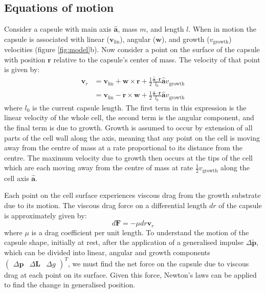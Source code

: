 \documentclass{report}
\let\oldhat\hat
\renewcommand{\vec}[1]{\mathbf{#1}}
\renewcommand{\hat}[1]{\oldhat{\mathbf{#1}}}
\newcommand{\deltap}{\Delta \vec{p}}
\newcommand{\deltaL}{\Delta \vec{L}}
\newcommand{\deltag}{\Delta g}
\begin{document}
\begin{appendices}
\chapter{Equations of motion}
\label{app:eqmot}
Consider a capsule with main axis $\hat{\vec{a}}$, mass $m$, and length $l$.  
When in motion the capsule is associated with linear ($\vec{v}_\textrm{lin}$),
angular ($\vec{w}$), and growth ($v_\textrm{growth}$) velocities (figure
\ref{fig:model}b).
Now consider a point on the
surface of the capsule with position $\vec{r}$ relative to the
capsule's center of mass.  The velocity of that point is given by:
\begin{align*}
\vec{v}_{r}
&=
\vec{v}_\textrm{lin}
+ \vec{w} \times \vec{r}
+ \frac{1}{2}\frac{\hat{a}\cdot\vec{r}}{l_0}\hat{a}v_\textrm{growth} \\
&=
\vec{v}_\textrm{lin}
- \vec{r} \times \vec{w}
+ \frac{1}{2}\frac{\hat{a}\cdot\vec{r}}{l_0}\hat{a}v_\textrm{growth}
\end{align*}
where $l_0$ is the current capsule length. The first term in this expression is
the linear velocity of the whole cell, the second term is the angular component,
and the final term is due to growth. Growth is assumed to occur by extension of
all parts of the cell wall along the axis, meaning that any point on the cell is
moving away from the centre of mass at a rate proportional to its distance from 
the centre. The maximum velocity due to growth then occurs at the tips of the cell
which are each moving away from the centre of mass at rate
$\frac{1}{2}v_\textrm{growth}$ along the cell axis $\hat{\vec{a}}$.

Each point on the cell surface experiences viscous drag from the growth substrate due
to its motion.  The viscous drag force on a differential length $dr$ of the
capsule is approximately given by: \[d\vec{F} = -\mu dr \vec{v}_r\] where $\mu$
is a drag coefficient per unit length.  To understand the motion of the capsule
shape, initially at rest, after the application of a generalised impulse
$\Delta\tilde{\vec{p}}$, which can be divided into linear, angular and growth
components $\left(\begin{array}{lll}\deltap & \deltaL &
\deltag\end{array}\right)^T$, we must find the net force on the capsule due to
viscous drag at each point on its surface. Given this force, Newton's laws can
be applied to find the change in generalised position.


\end{appendices}
\end{document}

